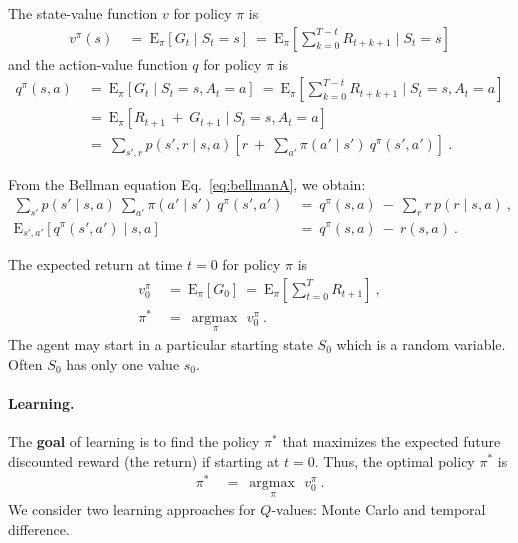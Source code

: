 \documentclass{article}
\newcommand\EXP{\mathbf{\mathrm{E}}}
\newcommand\argmax{\mathop{\mathrm{argmax}\,}}
\begin{document}
\begin{appendices}
The state-value function $v$ for policy $\pi$ is
\begin{align}
  v^{\pi}(s) \ &= \ \EXP_{\pi} \left[ G_t \mid S_t=s \right]
  \ = \ \EXP_{\pi} \left[\sum_{k=0}^{T-t}  R_{t+k+1}
  \mid S_t=s \right] 
\end{align}
and the action-value function $q$ for policy $\pi$ is
\begin{align}
  \label{eq:bellmanA}
  q^{\pi}(s,a) \ &= \ \EXP_{\pi} \left[ G_t \mid S_t=s, A_t=a \right]
  \ = \ \EXP_{\pi} \left[\sum_{k=0}^{T-t}   R_{t+k+1}
    \mid S_t=s, A_t=a \right] \\  \nonumber &= \
  \EXP_{\pi} \left[R_{t+1} \ + \   G_{t+1} \mid S_t=s, A_t=a  \right]
  \\ \nonumber &= \
  \sum_{s',r} p(s',r \mid s,a) \left[r \ + \  \sum_{a'}
    \pi(a'\mid s') \ q^{\pi}(s',a')  \right] \ .  
\end{align}

From the Bellman equation Eq.~\eqref{eq:bellmanA}, we obtain:
\begin{align}
  \label{eq:bellmanExp}
  \sum_{s'} p(s'\mid s,a) \ \sum_{a'} \pi(a' \mid s') \ q^\pi(s',a') \ &= \ 
  q^\pi(s,a) \ - \ \sum_{r} r \ p(r \mid s,a)  \ , \\
  \EXP_{s',a'} \left[ q^\pi(s',a') \mid s,a \right] \
  &= \  q^\pi(s,a) \ - \   r(s,a)  \ .
\end{align} 

The expected return at time $t=0$ for policy $\pi$ is
\begin{align}
  v_0^{\pi} \ &= \   \EXP_{\pi} \left[G_0\right]  \ = \ \EXP_{\pi}
  \left[\sum_{t=0}^{T} R_{t+1}\right] \ , \\ \nonumber
  \pi^{*} \ &= \ \underset{\pi}{\argmax} \ v_0^{\pi}  \ .
\end{align}
The agent may start in a particular starting state $S_0$ which is
a random variable. Often $S_0$ has only one value $s_0$.

\paragraph{Learning.}
The {\bf goal} of learning is to find the policy $\pi^{*}$ that
maximizes the expected future discounted reward (the return)
if starting at $t=0$. Thus, the optimal policy $\pi^{*}$ is
\begin{align}
\pi^{*} \ &= \ \underset{\pi}{\argmax} \ v_0^{\pi}  \ .
\end{align}
We consider two learning approaches for $Q$-values: Monte Carlo and
temporal difference. 


\end{appendices}
\end{document}
